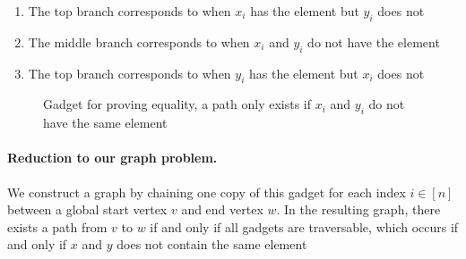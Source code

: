 \begin{enumerate}
    \item The top branch corresponds to when $x_i$ has the element but $y_i$ does not
    \item The middle branch corresponds to when $x_i$ and $y_i$ do not have the element
    \item The top branch corresponds to when $y_i$ has the element but $x_i$ does not
\end{enumerate}


\begin{figure}[h]
\centering
{}
\label{fig:disjoint_gadget}
\caption{Gadget for proving equality, a path only exists if $x_i$ and $y_i$ do not have the same element}
\end{figure}

\paragraph{Reduction to our graph problem.}
We construct a graph by chaining one copy of this gadget for each index $i \in [n]$ between a global start vertex $v$ and end vertex $w$. In the resulting graph, there exists a path from $v$ to $w$ if and only if all gadgets are traversable, which occurs if and only if $x$ and $y$ does not contain the same element\\


